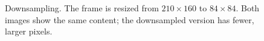 \begin{figure}[ht]
\begin{tikzpicture}[
    lbl/.style={font=\footnotesize, text=black!55},
    dimlbl/.style={font=\scriptsize, text=black!45},
]
\end{tikzpicture}
\caption{Downsampling. The frame is resized from $210 \times 160$
  to $84 \times 84$. Both images show the same content; the
  downsampled version has fewer, larger pixels.}
\label{fig:resize}
\end{figure}
